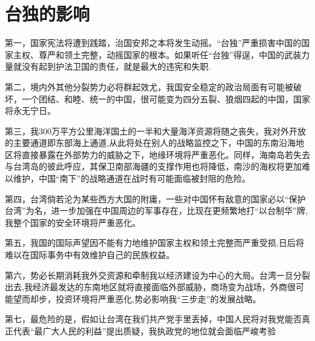 \documentclass[11pt,a4paper]{ctexart}
\begin{document}
  \section{台独的影响} 
  第一，国家宪法将遭到践踏，治国安邦之本将发生动摇。“台独”严重损害中国的国家主权、尊严和领土完整，动摇国家的根本。如果听任“台独”得逞，中国的武装力量就没有起到护法卫国的责任，就是最大的违宪和失职.\par
  第二，境内外其他分裂势力必将群起效尤，我国安全稳定的政治局面有可能被破坏，一个团结、和睦、统一的中国，很可能变为四分五裂、狼烟四起的中国，国家将永无宁日。\par
  第三，我300万平方公里海洋国土的一半和大量海洋资源将随之丧失，我对外开放的主要通道即东部海上通道,从此将处在别人的战略监控之下，中国的东南沿海地区将直接暴露在外部势力的威胁之下，地缘环境将严重恶化。同样，海南岛若失去与台湾岛的彼此呼应，其保卫南部海疆的支撑作用也将降低，南沙的海权将更加难以维护，中国“南下”的战略通道在战时有可能面临被封阻的危险。\par
  第四，台湾倘若沦为某些西方大国的附庸，一些对中国怀有敌意的国家必以“保护台湾”为名，进一步加强在中国周边的军事存在，比现在更频繁地打“以台制华”牌,我整个国家的安全环境将严重恶化。\par
  第五，我国的国际声望因不能有力地维护国家主权和领土完整而严重受损,日后将难以在国际事务中有效维护自己的民族权益。\par
  第六，势必长期消耗我外交资源和牵制我以经济建设为中心的大局。台湾一旦分裂出去,我经济最发达的东南地区就将直接面临外部威胁，商场变为战场，外商很可能望而却步，投资环境将严重恶化,势必影响我“三步走”的发展战略。\par
  第七，最危险的是，假如让台湾在我们共产党手里丢掉，中国人民将对我党能否真正代表“最广大人民的利益”提出质疑，我执政党的地位就会面临严峻考验\cite{q3}
\end{document}
